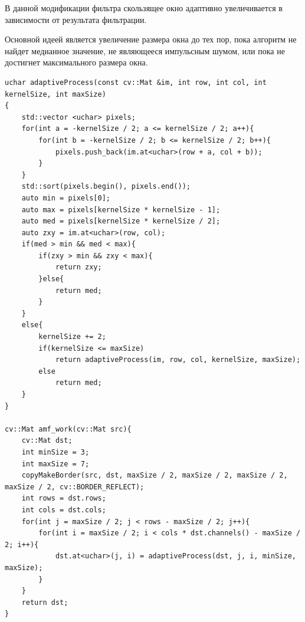 В данной модификации фильтра скользящее окно
адаптивно увеличивается в зависимости от результата фильтрации.

Основной идеей является увеличение размера окна до тех пор,
пока алгоритм не найдет медианное значение, не являющееся импульсным шумом, или пока 
не достигнет максимального размера окна.

\begin{lstlisting}[style=cpp_white, caption={Функции для применения адаптивного медианного фильтра}]
uchar adaptiveProcess(const cv::Mat &im, int row, int col, int kernelSize, int maxSize)
{
    std::vector <uchar> pixels;
    for(int a = -kernelSize / 2; a <= kernelSize / 2; a++){
        for(int b = -kernelSize / 2; b <= kernelSize / 2; b++){
            pixels.push_back(im.at<uchar>(row + a, col + b));
        }
    }
    std::sort(pixels.begin(), pixels.end());
    auto min = pixels[0];
    auto max = pixels[kernelSize * kernelSize - 1];
    auto med = pixels[kernelSize * kernelSize / 2];
    auto zxy = im.at<uchar>(row, col);
    if(med > min && med < max){
        if(zxy > min && zxy < max){
            return zxy;
        }else{
            return med;
        }
    }
    else{
        kernelSize += 2;
        if(kernelSize <= maxSize)
            return adaptiveProcess(im, row, col, kernelSize, maxSize);
        else
            return med;
    }
}

cv::Mat amf_work(cv::Mat src){
    cv::Mat dst;
    int minSize = 3;
    int maxSize = 7; 
    copyMakeBorder(src, dst, maxSize / 2, maxSize / 2, maxSize / 2, maxSize / 2, cv::BORDER_REFLECT);
    int rows = dst.rows;
    int cols = dst.cols;
    for(int j = maxSize / 2; j < rows - maxSize / 2; j++){
        for(int i = maxSize / 2; i < cols * dst.channels() - maxSize / 2; i++){
            dst.at<uchar>(j, i) = adaptiveProcess(dst, j, i, minSize, maxSize);
        }
    }
    return dst;
}
\end{lstlisting}

